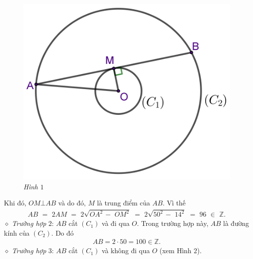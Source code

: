\begin{multicols}{2}
\begin{figure}[H]
		\includegraphics[width= 1\linewidth]{P663H1}
		\caption{\small\textit{\color{thachthuctoanhoc}Hình $1$}}
		\vspace*{-10pt}
	\end{figure}
	Khi đó, $OM \bot AB$ và do đó, $M$ là trung điểm của $AB$. Vì thế
	\begin{align*}
		AB\,\, = \,\,2AM\,\, = \,\,2\sqrt {O{A^2}\, - \,\,O{M^2}} \,\, = \,\,2\sqrt {{{50}^2}\, - \,\,{{14}^2}} \,\, = \,\,96\,\, \in \,\,\mathbb{Z}.
	\end{align*}
	$\diamond$ \textit{Trường hợp} $2$: $AB$ cắt  $(C_1)$ và đi qua $O$.
	\vskip 0.05cm
	Trong trường hợp này, $AB$ là đường kính của $(C_2).$ Do đó
	\begin{align*}
		AB = 2 \cdot 50 = 100 \in \mathbb{Z}.
	\end{align*}
	$\diamond$ \textit{Trường hợp} $3$: $AB$ cắt $(C_1)$ và không đi qua $O$ (xem Hình $2$).
	\begin{figure}[H]
		\vspace*{-5pt}
		\centering
		\captionsetup{labelformat= empty, justification=centering}

\end{figure}
\end{multicols}
